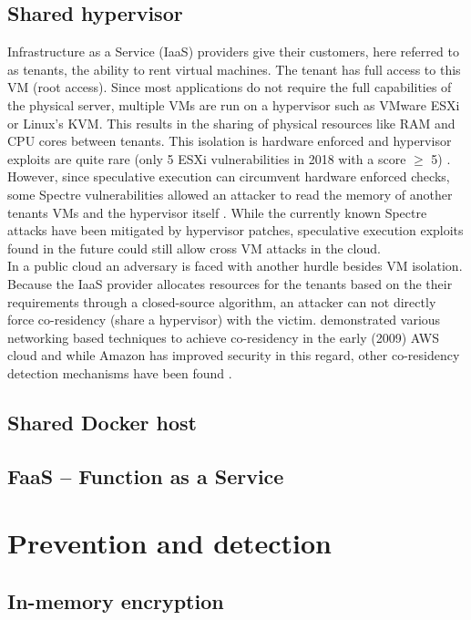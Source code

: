 \documentclass[conference,compsoc,final,a4paper]{IEEEtran}
\begin{document}
\subsection{Shared hypervisor}
Infrastructure as a Service (IaaS) providers give their customers, here referred to as tenants, the ability to rent virtual machines. The tenant has full access
to this VM (root access). Since most applications do not require the full capabilities of the physical server, multiple VMs are run on a hypervisor such as VMware
ESXi or Linux's KVM. This results in the sharing of physical resources like RAM and CPU cores between tenants. This isolation is hardware enforced
and hypervisor exploits are quite rare (only 5 ESXi vulnerabilities in 2018 with a score $\ge$ 5) \cite{esxiVulnerabilities}. However, since speculative execution can
circumvent hardware enforced checks, some Spectre vulnerabilities allowed an attacker to read the memory of another tenants VMs and the hypervisor
itself \cite{vmwareSpectre, vmwareSpectreNG}. While the currently known Spectre attacks have been mitigated by hypervisor patches, speculative execution exploits
found in the future could still allow cross VM attacks in the cloud. \\
In a public cloud an adversary is faced with another hurdle besides VM isolation. Because the IaaS provider allocates resources for the tenants based on the their
requirements through a closed-source algorithm, an attacker can not directly force co-residency (share a hypervisor) with the victim.
\textcite{Ristenpart:2009:HYG:1653662.1653687} demonstrated various networking based techniques to achieve co-residency in the early (2009) AWS cloud and while Amazon
has improved security in this regard, other co-residency detection mechanisms have been found \cite{inci2015seriously}.
\subsection{Shared Docker host}

\subsection{FaaS -- Function as a Service}

\section{Prevention and detection}
\subsection{In-memory encryption}
\end{document}
